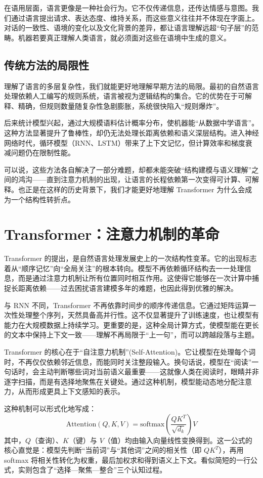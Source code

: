 在语用层面，语言更像是一种社会行为。它不仅传递信息，还传达情感与意图。我们通过语言提出请求、表达态度、维持关系，而这些意义往往并不体现在字面上。对话的一致性、语境的变化以及文化背景的差异，都让语言理解远超“句子层”的范畴。机器若要真正理解人类语言，就必须面对这些在语境中生成的意义。

\subsection{传统方法的局限性}

理解了语言的多层复杂性，我们就能更好地理解早期方法的局限。最初的自然语言处理依赖人工编写的规则系统，语言被视为逻辑结构的集合。它的优势在于可解释、精确，但规则数量随复杂性急剧膨胀，系统很快陷入“规则爆炸”。

后来统计模型兴起，通过大规模语料估计概率分布，使机器能“从数据中学语言”。这种方法显著提升了鲁棒性，却仍无法处理长距离依赖和语义深层结构。进入神经网络时代，循环模型（RNN、LSTM）带来了上下文记忆，但计算效率和梯度衰减问题仍在限制性能。

可以说，这些方法各自解决了一部分难题，却都未能突破“结构建模与语义理解”之间的鸿沟——直到注意力机制的出现，让语言的长程依赖第一次变得可计算、可解释。也正是在这样的历史背景下，我们才能更好地理解 Transformer 为什么会成为一个结构性转折点。

\section{Transformer：注意力机制的革命}

Transformer 的提出，是自然语言处理发展史上的一次结构性变革。它的出现标志着从“顺序记忆”向“全局关注”的根本转向。模型不再依赖循环结构去一一处理信息，而是通过注意力机制让所有位置同时相互作用。这使得它能够在一次计算中捕捉长距离依赖——过去困扰语言建模多年的难题，也因此得到优雅的解决。

与 RNN 不同，Transformer 不再依靠时间步的顺序传递信息。它通过矩阵运算一次性处理整个序列，天然具备高并行性。这不仅显著提升了训练速度，也让模型有能力在大规模数据上持续学习。更重要的是，这种全局计算方式，使模型能在更长的文本中保持上下文一致——理解不再局限于“上一句”，而可以跨越段落与主题。

Transformer 的核心在于“自注意力机制”(Self-Attention)。它让模型在处理每个词时，不再仅仅依赖邻近信息，而能同时关注整段输入。换句话说，模型在“阅读”一句话时，会主动判断哪些词对当前语义最重要——这就像人类在阅读时，眼睛并非逐字扫描，而是有选择地聚焦在关键处。通过这种机制，模型能动态地分配注意力，从而形成更具上下文感知的表示。

这种机制可以形式化地写成：
\[
\text{Attention}(Q,K,V)=\text{softmax}\left(\frac{QK^T}{\sqrt{d_k}}\right)V
\]
其中，$Q$（查询）、$K$（键）与 $V$（值）均由输入向量线性变换得到。这一公式的核心直觉是：模型先判断“当前词”与“其他词”之间的相关性（即 $QK^T$），再用 softmax 将相关性转化为权重，最后加权求和得到语义上下文。看似简短的一行公式，实则包含了“选择—聚焦—整合”三个认知过程。

